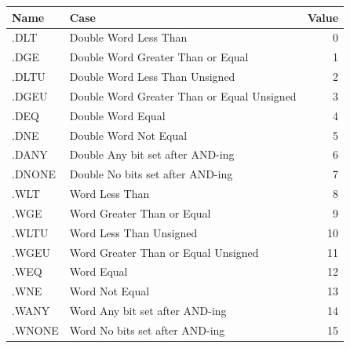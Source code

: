 {\noindent \begin{tabular}{|l|l|r|} \hline
\bf{Name} & \bf{Case} & \bf{Value} \\ \hline
.DLT & Double Word Less Than & 0 \\
.DGE & Double Word Greater Than or Equal & 1 \\
.DLTU & Double Word Less Than Unsigned & 2 \\
.DGEU & Double Word Greater Than or Equal Unsigned & 3 \\
.DEQ & Double Word Equal & 4 \\
.DNE & Double Word Not Equal & 5 \\
.DANY & Double Any bit set after AND-ing & 6 \\
.DNONE & Double No bits set after AND-ing & 7 \\
.WLT & Word Less Than & 8 \\
.WGE & Word Greater Than or Equal & 9 \\
.WLTU & Word Less Than Unsigned & 10 \\
.WGEU & Word Greater Than or Equal Unsigned & 11 \\
.WEQ & Word Equal & 12 \\
.WNE & Word Not Equal & 13 \\
.WANY & Word Any bit set after AND-ing & 14 \\
.WNONE & Word No bits set after AND-ing & 15 \\
\hline \end{tabular}
\newpage
\subsubsectionfont{}
}
